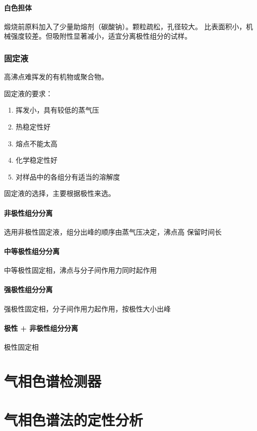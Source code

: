 \paragraph{白色担体} 煅烧前原料加入了少量助熔剂（碳酸钠）。颗粒疏松，孔径较大。
比表面积小，机械强度较差。但吸附性显著减小，适宜分离极性组分的试样。


\subsubsection{固定液}

高沸点难挥发的有机物或聚合物。

固定液的要求：

\begin{enumerate}
    \item 挥发小，具有较低的蒸气压
    \item 热稳定性好
    \item 熔点不能太高
    \item 化学稳定性好
    \item 对样品中的各组分有适当的溶解度
\end{enumerate}

固定液的选择，主要根据极性来选。

\paragraph{非极性组分分离} 选用非极性固定液，组分出峰的顺序由蒸气压决定，沸点高
保留时间长

\paragraph{中等极性组分分离} 中等极性固定相，沸点与分子间作用力同时起作用

\paragraph{强极性组分分离} 强极性固定相，分子间作用力起作用，按极性大小出峰

\paragraph{极性 + 非极性组分分离} 极性固定相

\section{气相色谱检测器}

\section{气相色谱法的定性分析}

